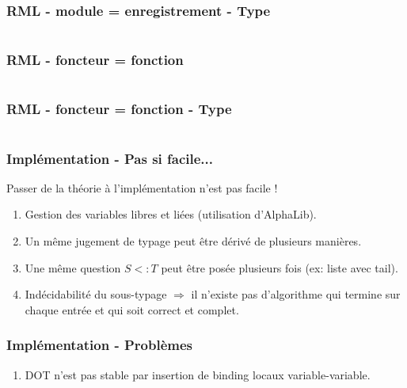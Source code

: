 \documentclass{beamer}
\begin{document}
\begin{frame}
  \frametitle{RML - module = enregistrement - Type}
  \inputminted{OCaml}{codes/point2d.rmli}
\end{frame}

\begin{frame}
  \frametitle{RML - foncteur = fonction}
  \inputminted{OCaml}{codes/makepoint2d.rml}
\end{frame}

\begin{frame}
  \frametitle{RML - foncteur = fonction - Type}
  \inputminted{OCaml}{codes/makepoint2d_sig.rml}
\end{frame}


\begin{frame}
  \frametitle{Implémentation - Pas si facile...}
  Passer de la théorie à l'implémentation n'est pas facile !
  \begin{enumerate}
  \item Gestion des variables libres et liées (utilisation d'AlphaLib).
  \item Un même jugement de typage peut être dérivé de plusieurs manières.
  \item Une même question $S <: T$ peut être posée plusieurs fois (ex: liste
    avec tail).
  \item Indécidabilité du sous-typage $\Rightarrow$ il n'existe pas d'algorithme
    qui termine sur chaque entrée et qui soit correct et complet.
  \end{enumerate}
\end{frame}


\begin{frame}
  \frametitle{Implémentation - Problèmes}
  \begin{enumerate}
  \item DOT n'est pas stable par insertion de binding locaux variable-variable.
    \inputminted{OCaml}{codes/terms_binding_variable.rml}
  \end{enumerate}
\end{frame}
\end{document}
